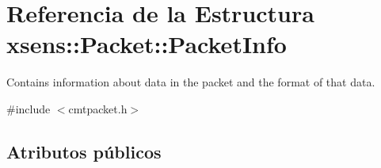 \hypertarget{structxsens_1_1Packet_1_1PacketInfo}{\section{\-Referencia de la \-Estructura xsens\-:\-:\-Packet\-:\-:\-Packet\-Info}
\label{structxsens_1_1Packet_1_1PacketInfo}
}


\-Contains information about data in the packet and the format of that data.  




{\ttfamily \#include $<$cmtpacket.\-h$>$}

\subsection*{\-Atributos públicos}
